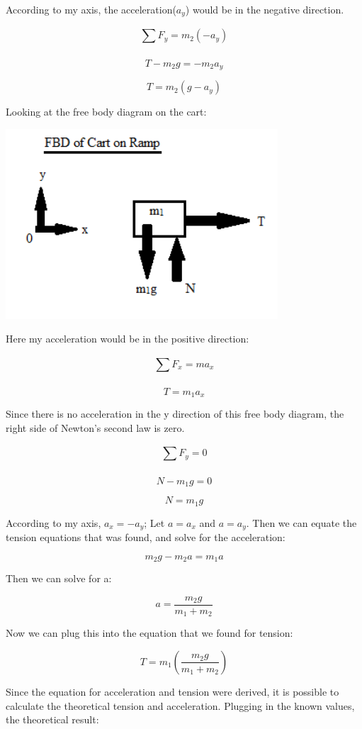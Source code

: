 \documentclass[aps,letterpaper,11pt]{revtex4}
\begin{document}
According to my axis, the acceleration($a_y$) would be in the negative direction.

$$ \sum_{}^{} F_y = m_2(-a_y) $$

$$ T - m_2g = -m_2a_y$$

$$ T = m_2(g-a_y)$$

Looking at the free body diagram on the cart:

\begin{center}
\includegraphics[width=4in]{FBD1Accelerating.png}\\
\end{center}

Here my acceleration would be in the positive direction:

$$ \sum_{}^{} F_x = ma_x$$

$$ T = m_1a_x$$

Since there is no acceleration in the y direction of this free body diagram, the right side of Newton's second law is zero.

$$ \sum_{}^{} F_y = 0$$

$$ N - m_1g = 0$$

$$ N = m_1g$$ 

According to my axis, $a_x = -a_y$; Let $a = a_x $ and $a = a_y$. Then we can equate the tension equations that was found, and solve for the acceleration:

$$ m_2g - m_2a = m_1a$$

Then we can solve for a:

$$ a = \frac{m_2g}{m_1 + m_2}$$

Now we can plug this into the equation that we found for tension:

$$ T = m_1(\frac{m_2g}{m_1 + m_2})$$

Since the equation for acceleration and tension were derived, it is possible to calculate the theoretical tension and acceleration. Plugging in the known values, the theoretical result:
\end{document}
